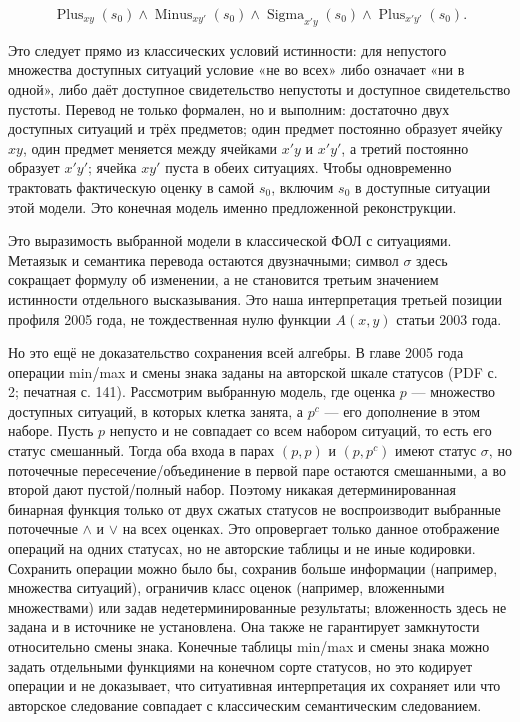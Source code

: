 \documentclass[12pt,a4paper]{article}
\begin{document}
\[
\operatorname{Plus}_{xy}(s_0)\land
\operatorname{Minus}_{xy'}(s_0)\land
\operatorname{Sigma}_{x'y}(s_0)\land
\operatorname{Plus}_{x'y'}(s_0).
\]

Это следует прямо из классических условий истинности: для непустого множества доступных ситуаций условие «не во всех» либо означает «ни в одной», либо даёт доступное свидетельство непустоты и доступное свидетельство пустоты. Перевод не только формален, но и выполним: достаточно двух доступных ситуаций и трёх предметов; один предмет постоянно образует ячейку \(xy\), один предмет меняется между ячейками \(x'y\) и \(x'y'\), а третий постоянно образует \(x'y'\); ячейка \(xy'\) пуста в обеих ситуациях. Чтобы одновременно трактовать фактическую оценку в самой \(s_0\), включим \(s_0\) в доступные ситуации этой модели. Это конечная модель именно предложенной реконструкции.

Это выразимость выбранной модели в классической ФОЛ с ситуациями. Метаязык и семантика перевода остаются двузначными; символ \(\sigma\) здесь сокращает формулу об изменении, а не становится третьим значением истинности отдельного высказывания. Это наша интерпретация третьей позиции профиля 2005 года, не тождественная нулю функции \(A(x,y)\) статьи 2003 года.

Но это ещё не доказательство сохранения всей алгебры. В главе 2005 года операции min/max и смены знака заданы на авторской шкале статусов (PDF с. 2; печатная с. 141). Рассмотрим выбранную модель, где оценка \(p\) — множество доступных ситуаций, в которых клетка занята, а \(p^c\) — его дополнение в этом наборе. Пусть \(p\) непусто и не совпадает со всем набором ситуаций, то есть его статус смешанный. Тогда оба входа в парах \((p,p)\) и \((p,p^c)\) имеют статус \(\sigma\), но поточечные пересечение/объединение в первой паре остаются смешанными, а во второй дают пустой/полный набор. Поэтому никакая детерминированная бинарная функция только от двух сжатых статусов не воспроизводит выбранные поточечные \(\land\) и \(\lor\) на всех оценках. Это опровергает только данное отображение операций на одних статусах, но не авторские таблицы и не иные кодировки. Сохранить операции можно было бы, сохранив больше информации (например, множества ситуаций), ограничив класс оценок (например, вложенными множествами) или задав недетерминированные результаты; вложенность здесь не задана и в источнике не установлена. Она также не гарантирует замкнутости относительно смены знака. Конечные таблицы min/max и смены знака можно задать отдельными функциями на конечном сорте статусов, но это кодирует операции и не доказывает, что ситуативная интерпретация их сохраняет или что авторское следование совпадает с классическим семантическим следованием.
\end{document}
